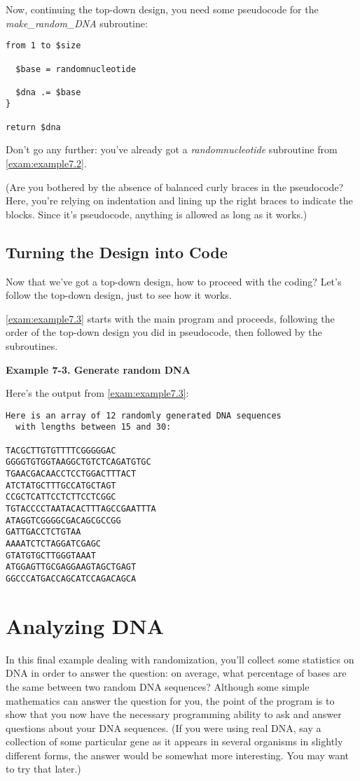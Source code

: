 Now, continuing the top-down design, you need some pseudocode for the \textit{make\_random\_DNA} subroutine:

\begin{lstlisting}
from 1 to $size

  $base = randomnucleotide

  $dna .= $base
}

return $dna
\end{lstlisting}

Don't go any further: you've already got a \textit{randomnucleotide} subroutine from \autoref{exam:example7.2}.

(Are you bothered by the absence of balanced curly braces in the pseudocode? Here, you're relying on indentation and lining up the right braces to indicate the blocks. Since it's pseudocode, anything is allowed as long as it works.) 

\subsection{Turning the Design into Code}
Now that we've got a top-down design, how to proceed with the coding? Let's follow the top-down design, just to see how it works.

\autoref{exam:example7.3} starts with the main program and proceeds, following the order of the top-down design you did in pseudocode, then followed by the subroutines. 

\textbf{Example 7-3. Generate random DNA}


Here's the output from \autoref{exam:example7.3}:

\begin{lstlisting}
Here is an array of 12 randomly generated DNA sequences
  with lengths between 15 and 30:

TACGCTTGTGTTTTCGGGGGAC
GGGGTGTGGTAAGGCTGTCTCAGATGTGC
TGAACGACAACCTCCTGGACTTTACT
ATCTATGCTTTGCCATGCTAGT
CCGCTCATTCCTCTTCCTCGGC
TGTACCCCTAATACACTTTAGCCGAATTTA
ATAGGTCGGGGCGACAGCGCCGG
GATTGACCTCTGTAA
AAAATCTCTAGGATCGAGC
GTATGTGCTTGGGTAAAT
ATGGAGTTGCGAGGAAGTAGCTGAGT
GGCCCATGACCAGCATCCAGACAGCA
\end{lstlisting}

\section{Analyzing DNA}
In this final example dealing with randomization, you'll collect some statistics on DNA in order to answer the question: on average, what percentage of bases are the same between two random DNA sequences?  Although some simple mathematics can answer the question for you, the point of the program is to show that you now have the necessary programming ability to ask and answer questions about your DNA sequences. (If you were using real DNA, say a collection of some particular gene as it appears in several organisms in slightly different forms, the answer would be somewhat more interesting. You may want to try that later.)

